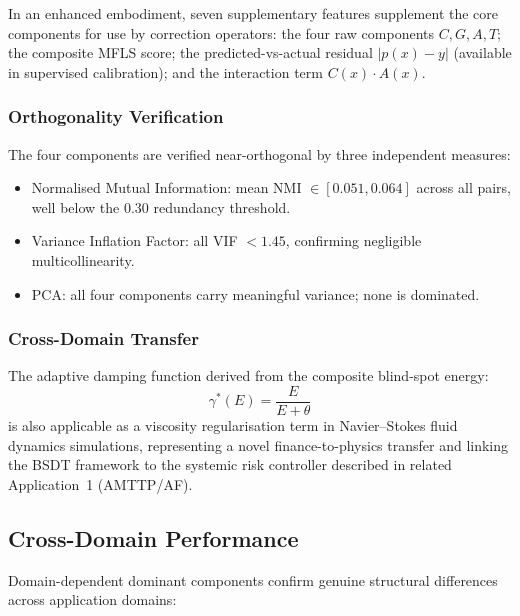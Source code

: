 \documentclass[12pt,a4paper]{article}
\begin{document}
In an enhanced embodiment, seven supplementary features supplement the
core components for use by correction operators: the four raw components
$C,G,A,T$; the composite MFLS score; the predicted-vs-actual residual
$|p(x)-y|$ (available in supervised calibration); and the interaction
term $C(x)\cdot A(x)$.

\subsubsection{Orthogonality Verification}

The four components are verified near-orthogonal by three independent
measures:
\begin{itemize}
\item Normalised Mutual Information: mean NMI $\in[0.051,0.064]$ across all
pairs, well below the 0.30 redundancy threshold.
\item Variance Inflation Factor: all VIF $<1.45$, confirming negligible
multicollinearity.
\item PCA: all four components carry meaningful variance; none is dominated.
\end{itemize}

\subsubsection{Cross-Domain Transfer}

The adaptive damping function derived from the composite blind-spot energy:
\begin{equation}
\gamma^*(E)=\frac{E}{E+\theta}
\end{equation}
is also applicable as a viscosity regularisation term in Navier--Stokes
fluid dynamics simulations, representing a novel finance-to-physics transfer
and linking the BSDT framework to the systemic risk controller described in
related Application~1 (AMTTP/AF).

\subsection{Cross-Domain Performance}

Domain-dependent dominant components confirm genuine structural differences
across application domains:
\end{document}
